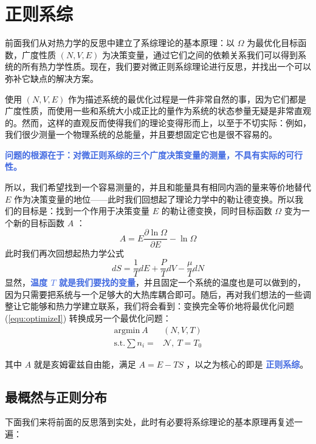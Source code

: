 
\chapter{正则系综}\label{cha:正则系综}

前面我们从对热力学的反思中建立了系综理论的基本原理：以 $\Omega$ 为最优化目标函数，广度性质 $(N,V,E)$ 为决策变量，通过它们之间的依赖关系我们可以得到系统的所有热力学性质。现在，我们要对微正则系综理论进行反思，并找出一个可以弥补它缺点的解决方案。

使用 $(N,V,E)$ 作为描述系统的最优化过程是一件非常自然的事，因为它们都是广度性质，而使用一些和系统大小成正比的量作为系统的状态参量无疑是非常直观的。然而，这样的直观反而使得我们的理论变得形而上，以至于不切实际：例如，我们很少测量一个物理系统的总能量，并且要想固定它也是很不容易的。

\textcolor{RoyalBlue}{\textbf{\kaishu 问题的根源在于：对微正则系综的三个广度决策变量的测量，不具有实际的可行性。}}  

所以，我们希望找到一个容易测量的，并且和能量具有相同内涵的量来等价地替代 $E$ 作为决策变量的地位——此时我们回想起了理论力学中的勒让德变换。所以我们的目标是：找到一个作用于决策变量 $E$ 的勒让德变换，同时目标函数 $\Omega$ 变为一个新的目标函数 $A$ ：
\[
    A = E\frac{\partial \ln\Omega}{\partial E} - \ln\Omega
\]
此时我们再次回想起热力学公式
\[
    dS = \frac{1}{T} dE + \frac{P}{T} dV - \frac{\mu}{T} dN
\]
显然，\textcolor{RoyalBlue}{\textbf{\kaishu 温度 $T$ 就是我们要找的变量}}，并且固定一个系统的温度也是可以做到的，因为只需要把系统与一个足够大的大热库耦合即可。随后，再对我们想法的一些调整让它能够和热力学建立联系，我们将会看到：变换完全等价地将最优化问题 (\ref*{equ:optimizeI}) 转换成另一个最优化问题：
\begin{equation}\label{equ:optimizeII}
    \begin{split}
        \text{argmin}~ A&(N,V,T)\\
        \text{s.t.}\sum n_i = &\mathcal{N},~ T = T_0
    \end{split}
\end{equation}

其中 $A$ 就是亥姆霍兹自由能，满足 $A = E - TS$ ，以之为核心的即是 \textcolor{RoyalBlue}{\textbf{\kaishu 正则系综}}。

\section{最概然与正则分布}\label{sec:最概然与正则分布}

下面我们来将前面的反思落到实处，此时有必要将系综理论的基本原理再复述一遍：

